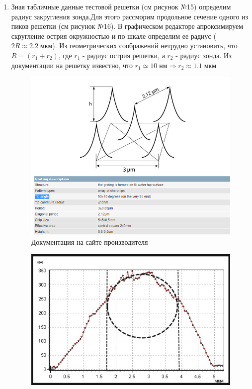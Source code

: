 \documentclass[a4paper,12pt]{article}
\theoremstyle{plain} %
\theoremstyle{definition} %
\theoremstyle{remark} %
\newcommand{\s}[0]{
	\;	
}
\begin{document}
\begin{itemize}
\begin{enumerate}
\begin{itemize}
\end{itemize}
\item 
Зная табличные данные тестовой решетки (см рисунок №15) определим радиус закругления зонда.Для этого рассморим продольное сечение одного из пиков решетки (см рисунок №16). В графическом редакторе апроксимируем скругление острия окружностью и по шкале определим ее радиус ($ 2R\approx2.2\s мкм $).
Из геометрических соображений нетрудно установить, что $ R=(r_1+r_2) $, где $ r_1 $ - радиус острия решетки, а $ r_2 $ - радиус зонда. Из документации на решетку известно, что $ r_1\simeq 10\s нм\Rightarrow r_2\approx 1.1\s мкм $
\begin{figure}[h]
	\centering
	\includegraphics[scale=0.8]{info.png}
	\caption{Документация на сайте производителя}
	\label{info}
\end{figure}
\begin{figure}[h]
	\centering
	\includegraphics[scale=1]{103.jpg}

\end{figure}
\end{enumerate}
\end{itemize}
\end{document}
